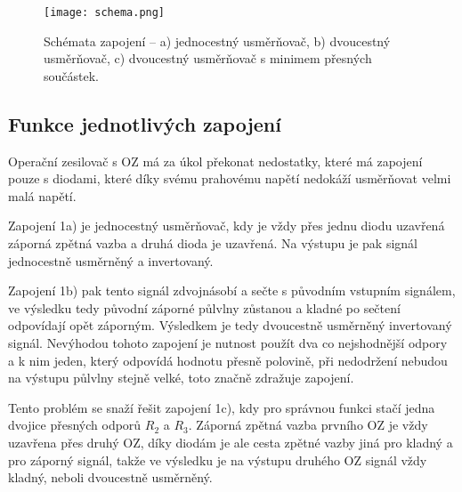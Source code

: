 \begin{figure}[h!]
    \centering
    \texttt{[image: schema.png]}
    \centering
    \caption{Schémata zapojení -- a) jednocestný usměrňovač, b) dvoucestný usměrňovač, c) dvoucestný usměrňovač s minimem přesných součástek.}
    \label{fig:schema}
\end{figure}



\subsection{Funkce jednotlivých zapojení}

    Operační zesilovač s OZ má za úkol překonat nedostatky, které má zapojení pouze s diodami, které díky svému prahovému napětí nedokáží usměrňovat velmi malá napětí. 
    
    Zapojení 1a) je jednocestný usměrňovač, kdy je vždy přes jednu diodu uzavřená záporná zpětná vazba a druhá dioda je uzavřená. Na výstupu je pak signál jednocestně usměrněný a invertovaný. 
    
    Zapojení 1b) pak tento signál zdvojnásobí a sečte s původním vstupním signálem, ve výsledku tedy původní záporné půlvlny zůstanou a kladné po sečtení odpovídají opět záporným. Výsledkem je tedy dvoucestně usměrněný invertovaný signál. 
    Nevýhodou tohoto zapojení je nutnost použít dva co nejshodnější odpory a k nim jeden, který odpovídá hodnotu přesně polovině, při nedodržení nebudou na výstupu půlvlny stejně velké, toto značně zdražuje zapojení. 

    Tento problém se snaží řešit zapojení 1c), kdy pro správnou funkci stačí jedna dvojice přesných odporů \( R_2\) a \(R_3\). Záporná zpětná vazba prvního OZ je vždy uzavřena přes druhý OZ, díky diodám je ale cesta zpětné vazby jiná pro kladný a pro záporný signál, takže ve výsledku je na výstupu druhého OZ signál vždy kladný, neboli dvoucestně usměrněný.   